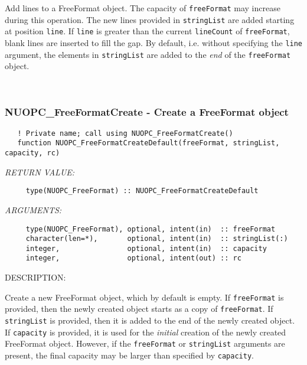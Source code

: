      Add lines to a FreeFormat object. The capacity of {\tt freeFormat} may 
     increase during this operation. The new lines provided in {\tt stringList}
     are added starting at position {\tt line}. If {\tt line} is greater than the
     current {\tt lineCount} of {\tt freeFormat}, blank lines are inserted to
     fill the gap. By default, i.e. without specifying the {\tt line} argument,
     the elements in {\tt stringList} are added to the {\em end} of the
     {\tt freeFormat} object. 
 
\mbox{}\hrulefill\ 
 
\subsubsection [NUOPC\_FreeFormatCreate] {NUOPC\_FreeFormatCreate - Create a FreeFormat object}


\begin{verbatim}   ! Private name; call using NUOPC_FreeFormatCreate()
   function NUOPC_FreeFormatCreateDefault(freeFormat, stringList, capacity, rc)\end{verbatim}{\em RETURN VALUE:}
\begin{verbatim}     type(NUOPC_FreeFormat) :: NUOPC_FreeFormatCreateDefault\end{verbatim}{\em ARGUMENTS:}
\begin{verbatim}     type(NUOPC_FreeFormat), optional, intent(in)  :: freeFormat
     character(len=*),       optional, intent(in)  :: stringList(:)
     integer,                optional, intent(in)  :: capacity
     integer,                optional, intent(out) :: rc\end{verbatim}
{\sf DESCRIPTION:\\ }


     Create a new FreeFormat object, which by default is empty. 
     If {\tt freeFormat} is provided, then the newly created object starts as
     a copy of {\tt freeFormat}. If {\tt stringList} is provided, then it is
     added to the end of the newly created object. If {\tt capacity} is provided,
     it is used for the {\em initial} creation of the newly created FreeFormat 
     object. However, if the {\tt freeFormat} or {\tt stringList} arguments are
     present, the final capacity may be larger than specified by {\tt capacity}. 
 
\mbox{}\hrulefill\ 
 
